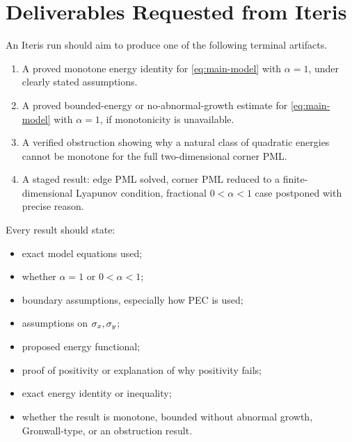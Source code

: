 \documentclass[UTF8,a4paper,12pt]{ctexart}
\begin{document}
\section{Deliverables Requested from Iteris}

An Iteris run should aim to produce one of the following terminal artifacts.

\begin{enumerate}
\item A proved monotone energy identity for \eqref{eq:main-model} with \(\alpha=1\), under clearly stated assumptions.
\item A proved bounded-energy or no-abnormal-growth estimate for \eqref{eq:main-model} with \(\alpha=1\), if monotonicity is unavailable.
\item A verified obstruction showing why a natural class of quadratic energies cannot be monotone for the full two-dimensional corner PML.
\item A staged result: edge PML solved, corner PML reduced to a finite-dimensional Lyapunov condition, fractional \(0<\alpha<1\) case postponed with precise reason.
\end{enumerate}

Every result should state:
\begin{itemize}
\item exact model equations used;
\item whether \(\alpha=1\) or \(0<\alpha<1\);
\item boundary assumptions, especially how PEC is used;
\item assumptions on \(\sigma_x,\sigma_y\);
\item proposed energy functional;
\item proof of positivity or explanation of why positivity fails;
\item exact energy identity or inequality;
\item whether the result is monotone, bounded without abnormal growth, Gronwall-type, or an obstruction result.
\end{itemize}



\end{document}
